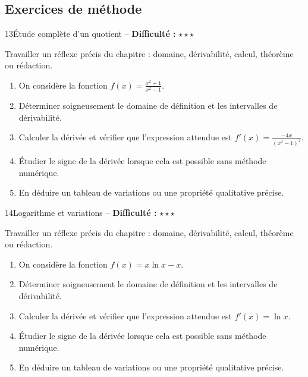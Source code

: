 \documentclass[11pt,a4paper]{article}
\newcommand{\etoiles}[1]{\textbf{Difficulté :} #1}
\begin{document}
\subsection{Exercices de méthode}

\begin{exobox}{13}{Étude complète d'un quotient -- \etoiles{$\star\star\star$}}

\begin{objectifbox}
Travailler un réflexe précis du chapitre : domaine, dérivabilité, calcul, théorème ou rédaction.
\end{objectifbox}

\begin{enumerate}

\item On considère la fonction $f(x)=\frac{x^2+1}{x^2-1}$.

\item Déterminer soigneusement le domaine de définition et les intervalles de dérivabilité.

\item Calculer la dérivée et vérifier que l'expression attendue est $f'(x)=\frac{-4x}{(x^2-1)^2}$.

\item Étudier le signe de la dérivée lorsque cela est possible sans méthode numérique.

\item En déduire un tableau de variations ou une propriété qualitative précise.

\end{enumerate}

\end{exobox}


\begin{exobox}{14}{Logarithme et variations -- \etoiles{$\star\star\star$}}

\begin{objectifbox}
Travailler un réflexe précis du chapitre : domaine, dérivabilité, calcul, théorème ou rédaction.
\end{objectifbox}

\begin{enumerate}

\item On considère la fonction $f(x)=x\ln x-x$.

\item Déterminer soigneusement le domaine de définition et les intervalles de dérivabilité.

\item Calculer la dérivée et vérifier que l'expression attendue est $f'(x)=\ln x$.

\item Étudier le signe de la dérivée lorsque cela est possible sans méthode numérique.

\item En déduire un tableau de variations ou une propriété qualitative précise.

\end{enumerate}

\end{exobox}
\end{document}
